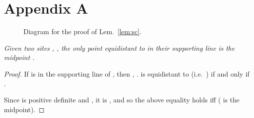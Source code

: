 \documentclass[11pt]{article}
\begin{document}
\newpage
\section*{Appendix A}\label{app:prelim}

\begin{figure}[ht]
\centering
{}
\label{fig:sc}
\caption{Diagram for the proof of Lem.~\ref{lem:sc}.}
\end{figure}


\emph{Given two sites , , the only point equidistant to  in their supporting line is the midpoint . }
\begin{proof}
If  is in the supporting line of , then , . 
	 is equidistant to  (i.e.\ ) if and only if
		.

	Since  is positive definite and , it is , 
	and so the above equality holds iff  ( is the midpoint).
\end{proof}
\end{document}
